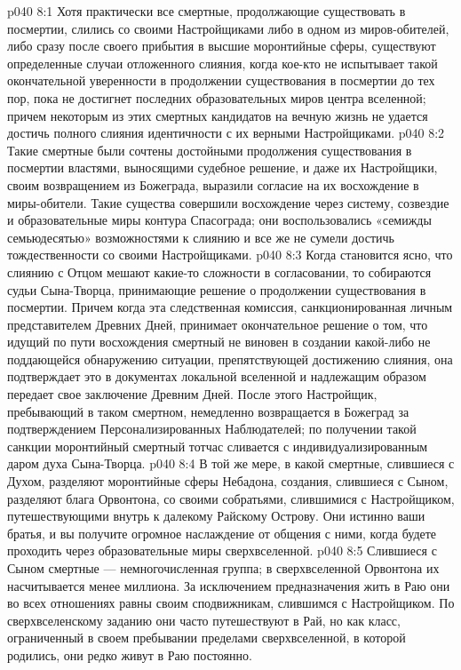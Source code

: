 \vs p040 8:1 Хотя практически все смертные, продолжающие существовать в посмертии, слились со своими Настройщиками либо в одном из миров\hyp{}обителей, либо сразу после своего прибытия в высшие моронтийные сферы, существуют определенные случаи отложенного слияния, когда кое\hyp{}кто не испытывает такой окончательной уверенности в продолжении существования в посмертии до тех пор, пока не достигнет последних образовательных миров центра вселенной; причем некоторым из этих смертных кандидатов на вечную жизнь не удается достичь полного слияния идентичности с их верными Настройщиками.
\vs p040 8:2 Такие смертные были сочтены достойными продолжения существования в посмертии властями, выносящими судебное решение, и даже их Настройщики, своим возвращением из Божеграда, выразили согласие на их восхождение в миры\hyp{}обители. Такие существа совершили восхождение через систему, созвездие и образовательные миры контура Спасограда; они воспользовались «семижды семьюдесятью» возможностями к слиянию и все же не сумели достичь тождественности со своими Настройщиками.
\vs p040 8:3 Когда становится ясно, что слиянию с Отцом мешают какие\hyp{}то сложности в согласовании, то собираются судьи Сына\hyp{}Творца, принимающие решение о продолжении существования в посмертии. Причем когда эта следственная комиссия, санкционированная личным представителем Древних Дней, принимает окончательное решение о том, что идущий по пути восхождения смертный не виновен в создании какой\hyp{}либо не поддающейся обнаружению ситуации, препятствующей достижению слияния, она подтверждает это в документах локальной вселенной и надлежащим образом передает свое заключение Древним Дней. После этого Настройщик, пребывающий в таком смертном, немедленно возвращается в Божеград за подтверждением Персонализированных Наблюдателей; по получении такой санкции моронтийный смертный тотчас сливается с индивидуализированным даром духа Сына\hyp{}Творца.
\vs p040 8:4 \pc В той же мере, в какой смертные, слившиеся с Духом, разделяют моронтийные сферы Небадона, создания, слившиеся с Сыном, разделяют блага Орвонтона, со своими собратьями, слившимися с Настройщиком, путешествующими внутрь к далекому Райскому Острову. Они истинно ваши братья, и вы получите огромное наслаждение от общения с ними, когда будете проходить через образовательные миры сверхвселенной.
\vs p040 8:5 Слившиеся с Сыном смертные --- немногочисленная группа; в сверхвселенной Орвонтона их насчитывается менее миллиона. За исключением предназначения жить в Раю они во всех отношениях равны своим сподвижникам, слившимся с Настройщиком. По сверхвселенскому заданию они часто путешествуют в Рай, но как класс, ограниченный в своем пребывании пределами сверхвселенной, в которой родились, они редко живут в Раю постоянно.
